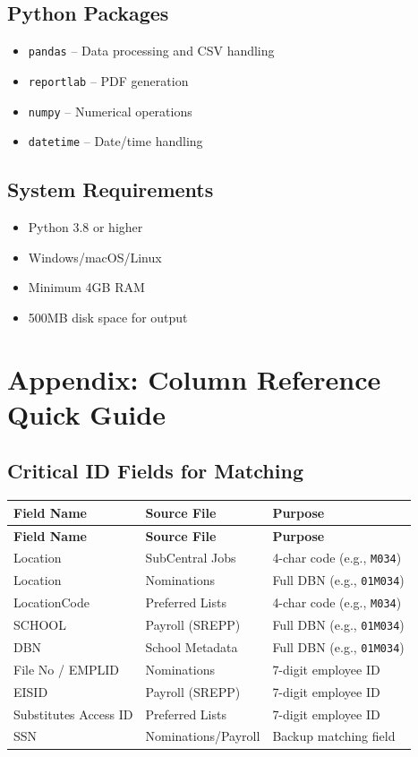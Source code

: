 \documentclass[12pt,letterpaper]{article}
\begin{document}
\subsection{Python Packages}

\begin{itemize}[leftmargin=*]
    \item \texttt{pandas} -- Data processing and CSV handling
    \item \texttt{reportlab} -- PDF generation
    \item \texttt{numpy} -- Numerical operations
    \item \texttt{datetime} -- Date/time handling
\end{itemize}

\subsection{System Requirements}

\begin{itemize}[leftmargin=*]
    \item Python 3.8 or higher
    \item Windows/macOS/Linux
    \item Minimum 4GB RAM
    \item 500MB disk space for output
\end{itemize}

\section{Appendix: Column Reference Quick Guide}

\subsection{Critical ID Fields for Matching}

\begin{longtable}{p{4cm}p{4cm}p{5cm}}
\toprule
\textbf{Field Name} & \textbf{Source File} & \textbf{Purpose} \\
\midrule
\endfirsthead
\toprule
\textbf{Field Name} & \textbf{Source File} & \textbf{Purpose} \\
\midrule
\endhead
Location & SubCentral Jobs & 4-char code (e.g., \texttt{M034}) \\
\midrule
Location & Nominations & Full DBN (e.g., \texttt{01M034}) \\
\midrule
LocationCode & Preferred Lists & 4-char code (e.g., \texttt{M034}) \\
\midrule
SCHOOL & Payroll (SREPP) & Full DBN (e.g., \texttt{01M034}) \\
\midrule
DBN & School Metadata & Full DBN (e.g., \texttt{01M034}) \\
\midrule
File No / EMPLID & Nominations & 7-digit employee ID \\
\midrule
EISID & Payroll (SREPP) & 7-digit employee ID \\
\midrule
Substitutes Access ID & Preferred Lists & 7-digit employee ID \\
\midrule
SSN & Nominations/Payroll & Backup matching field \\
\bottomrule
\end{longtable}
\end{document}
